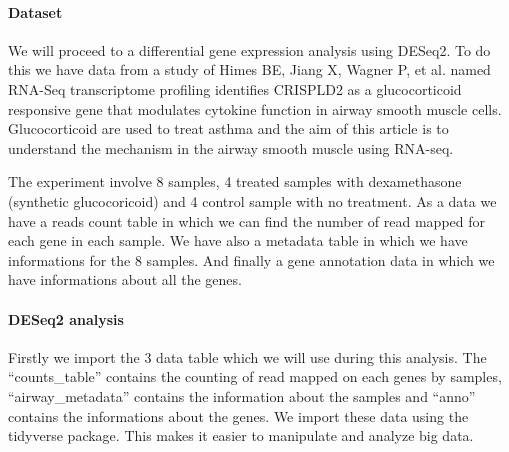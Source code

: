 \documentclass[]{article}
\newenvironment{Shaded}{\begin{snugshade}}{\end{snugshade}}
\newcommand{\KeywordTok}[1]{\textcolor[rgb]{0.13,0.29,0.53}{\textbf{#1}}}
\newcommand{\StringTok}[1]{\textcolor[rgb]{0.31,0.60,0.02}{#1}}
\newcommand{\CommentTok}[1]{\textcolor[rgb]{0.56,0.35,0.01}{\textit{#1}}}
\newcommand{\OperatorTok}[1]{\textcolor[rgb]{0.81,0.36,0.00}{\textbf{#1}}}
\newcommand{\NormalTok}[1]{#1}
\let\oldparagraph\paragraph
\renewcommand{\paragraph}[1]{\oldparagraph{#1}\mbox{}}
\begin{document}
\paragraph{Dataset}\label{dataset}

We will proceed to a differential gene expression analysis using DESeq2.
To do this we have data from a study of Himes BE, Jiang X, Wagner P, et
al. named RNA-Seq transcriptome profiling identifies CRISPLD2 as a
glucocorticoid responsive gene that modulates cytokine function in
airway smooth muscle cells. Glucocorticoid are used to treat asthma and
the aim of this article is to understand the mechanism in the airway
smooth muscle using RNA-seq.

The experiment involve 8 samples, 4 treated samples with dexamethasone
(synthetic glucocoricoid) and 4 control sample with no treatment. As a
data we have a reads count table in which we can find the number of read
mapped for each gene in each sample. We have also a metadata table in
which we have informations for the 8 samples. And finally a gene
annotation data in which we have informations about all the genes.

\paragraph{DESeq2 analysis}\label{deseq2-analysis}

Firstly we import the 3 data table which we will use during this
analysis. The ``counts\_table'' contains the counting of read mapped on
each genes by samples, ``airway\_metadata'' contains the information
about the samples and ``anno'' contains the informations about the
genes. We import these data using the tidyverse package. This makes it
easier to manipulate and analyze big data.

\begin{Shaded}
\end{Shaded}
\end{document}
